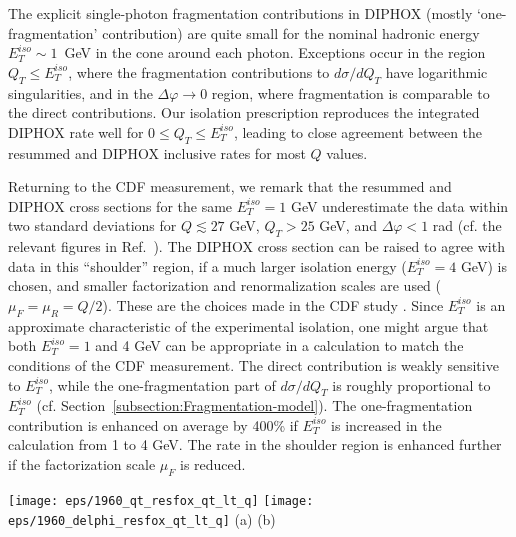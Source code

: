\documentclass[12pt,english,aps,preprint,prd,letterpaper,fleqn,nofootinbib,showpacs,showkeys,tightenlines,floatfix]{revtex4}
\begin{document}
The explicit single-photon fragmentation contributions in \textsc{DIPHOX}
(mostly `one-fragmentation' contribution) are quite small for the
nominal hadronic energy $E_{T}^{iso} \sim 1$~GeV in the cone around each photon. Exceptions
occur in the region $Q_{T}\leq E_{T}^{iso}$, where the fragmentation
contributions to $d\sigma/dQ_{T}$ have logarithmic singularities,
and in the $\Delta\varphi\rightarrow0$ region, where fragmentation
is comparable to the direct contributions. Our isolation prescription
reproduces the integrated \textsc{DIPHOX} rate well for $0\leq Q_{T}\leq E_{T}^{iso}$,
leading to close agreement between the resummed and \textsc{DIPHOX}
inclusive rates for most $Q$ values.

Returning to the CDF measurement, we remark that the resummed and
\textsc{DIPHOX} cross sections for the same $E_{T}^{iso}=1$ GeV underestimate
the data within two standard deviations for $Q\lesssim27$ GeV, $Q_{T}>25$
GeV, and $\Delta\varphi<1$ rad (cf.  the relevant figures in Ref.~\cite{Balazs:2006cc}).
The \textsc{DIPHOX} cross section can be raised to agree with data
in this {}``shoulder'' region, if a much larger isolation energy
($E_{T}^{iso}=4$ GeV) is chosen, and smaller factorization and renormalization
scales are used ($\mu_{F}=\mu_{R}=Q/2$). These are the choices made
in the CDF study \cite{Acosta:2004sn}. Since $E_{T}^{iso}$ is an 
approximate characteristic of the experimental isolation, one might
argue that both $E_{T}^{iso}=1$ and 4 GeV can be appropriate in a calculation
to match the conditions of the CDF measurement. The
direct contribution is weakly sensitive to $E_{T}^{iso}$, while the
one-fragmentation part of $d\sigma/dQ_{T}$ is roughly proportional to $E_{T}^{iso}$
(cf.  Section~\ref{subsection:Fragmentation-model}). The one-fragmentation
contribution is enhanced on average by 400\% if $E_{T}^{iso}$ is
increased in the calculation from 1 to 4 GeV. The rate in the shoulder
region is enhanced further if the factorization scale $\mu_{F}$ is reduced.

\begin{figure*}
\texttt{[image: eps/1960\_qt\_resfox\_qt\_lt\_q]}
\texttt{[image: eps/1960\_delphi\_resfox\_qt\_lt\_q]}
(a) \hspace{0.45\columnwidth} (b)


\caption{Predicted cross sections for diphoton production in $p\bar{p}\rightarrow\gamma\gamma X$
at $\sqrt{S}=1.96$~TeV as a function of (a) the $\gamma\gamma$
pair transverse momentum $Q_{T}$ and (b) the difference $\Delta\varphi$
in the azimuthal angles of the two photons. Our resummed predictions
(solid) are shown together with \textsc{DIPHOX} predictions for the
default isolation energy $E_{T}^{iso}=1$ GeV and factorization scale
$\mu_{F}=Q$ (dashed), and for $E_{T}^{iso}=4$ GeV, $\mu_{F}=Q/2$
(dotted). We impose the condition $Q_{T}<Q$ to reduce theoretical
uncertainties associated with fragmentation.}

\label{Fig:DeltaPhiCDFResFox2} 
\end{figure*}
\end{document}
